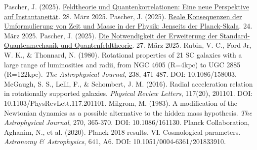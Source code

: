 \documentclass[12pt,a4paper]{article}
\begin{document}
\begin{thebibliography}{99}
		 Pascher, J. (2025). \href{https://github.com/jpascher/T0-Time-Mass-Duality/tree/main/2/pdf/Deutsch/FeldtheorieQuanten.pdf}{Feldtheorie und Quantenkorrelationen: Eine neue Perspektive auf Instantaneität}. 28. März 2025.
		 Pascher, J. (2025). \href{https://github.com/jpascher/T0-Time-Mass-Duality/tree/main/2/pdf/Deutsch/JenseitsPlanck.pdf}{Reale Konsequenzen der Umformulierung von Zeit und Masse in der Physik: Jenseits der Planck-Skala}. 24. März 2025.
		 Pascher, J. (2025). \href{https://github.com/jpascher/T0-Time-Mass-Duality/tree/main/2/pdf/Deutsch/NotwendigkeitQMErweiterung.pdf}{Die Notwendigkeit der Erweiterung der Standard-Quantenmechanik und Quantenfeldtheorie}. 27. März 2025.
		 Rubin, V. C., Ford Jr, W. K., \& Thonnard, N. (1980). Rotational properties of 21 SC galaxies with a large range of luminosities and radii, from NGC 4605 (R=4kpc) to UGC 2885 (R=122kpc). \textit{The Astrophysical Journal}, 238, 471-487. DOI: 10.1086/158003.
		 McGaugh, S. S., Lelli, F., \& Schombert, J. M. (2016). Radial acceleration relation in rotationally supported galaxies. \textit{Physical Review Letters}, 117(20), 201101. DOI: 10.1103/PhysRevLett.117.201101.
		 Milgrom, M. (1983). A modification of the Newtonian dynamics as a possible alternative to the hidden mass hypothesis. \textit{The Astrophysical Journal}, 270, 365-370. DOI: 10.1086/161130.
		 Planck Collaboration, Aghanim, N., et al. (2020). Planck 2018 results. VI. Cosmological parameters. \textit{Astronomy \& Astrophysics}, 641, A6. DOI: 10.1051/0004-6361/201833910.
	\end{thebibliography}
	
\end{document}
